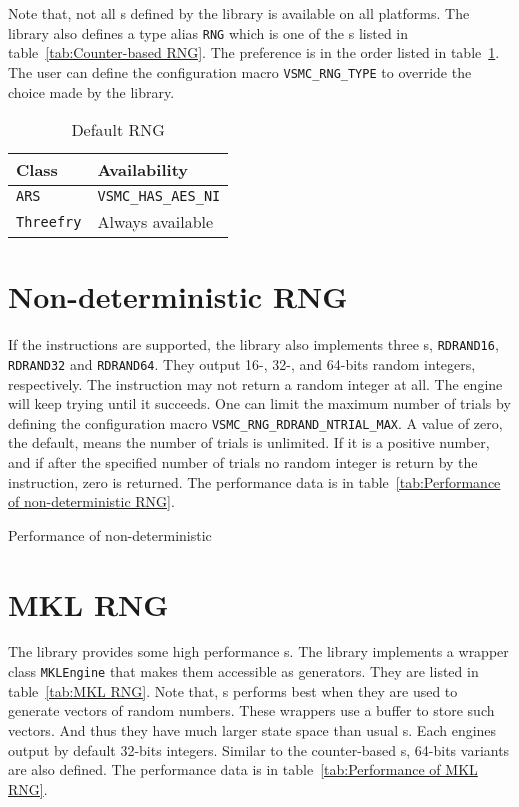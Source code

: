 Note that, not all \rng{}s defined by the library is available on all
platforms. The library also defines a type alias \verb|RNG| which is one of the
\rng{}s listed in table~\ref{tab:Counter-based RNG}. The preference is in the
order listed in table~\ref{tab:Default RNG}. The user can define the
configuration macro \verb|VSMC_RNG_TYPE| to override the choice made by the
library.

\begin{table}
  \begin{tabularx}{\textwidth}{XX}
    \toprule
    Class & Availability \\
    \midrule
    \verb|ARS|      & \verb|VSMC_HAS_AES_NI| \\
    \verb|Threefry| & Always available       \\
    \bottomrule
  \end{tabularx}
  \caption{Default RNG}
  \label{tab:Default RNG}
\end{table}

\section{Non-deterministic RNG}
\label{sec:Non-deterministic RNG}

If the \rdrand instructions are supported, the library also implements three
\rng{}s, \verb|RDRAND16|, \verb|RDRAND32| and \verb|RDRAND64|. They output 16-,
32-, and 64-bits random integers, respectively. The \rdrand instruction may not
return a random integer at all. The \rng engine will keep trying until it
succeeds. One can limit the maximum number of trials by defining the
configuration macro \verb|VSMC_RNG_RDRAND_NTRIAL_MAX|. A value of zero, the
default, means the number of trials is unlimited. If it is a positive number,
and if after the specified number of trials no random integer is return by the
\rdrand instruction, zero is returned. The performance data is in
table~\ref{tab:Performance of non-deterministic RNG}.

\begin{table}
  
  \caption{Performance of non-deterministic \rng}
  \label{tab:Performance of non-determinstic RNG}
\end{table}

\section{MKL RNG}
\label{sec:MKL RNG}

The \mkl library provides some high performance \rng{}s. The library implements
a wrapper class \verb|MKLEngine| that makes them accessible as \cppoo{}
generators. They are listed in table~\ref{tab:MKL RNG}. Note that, \mkl{}
\rng{}s performs best when they are used to generate vectors of random numbers.
These wrappers use a buffer to store such vectors. And thus they have much
larger state space than usual \rng{}s. Each \rng engines output by default
32-bits integers. Similar to the counter-based \rng{}s, 64-bits variants are
also defined. The performance data is in table~\ref{tab:Performance of MKL
  RNG}.

